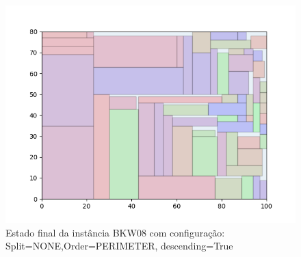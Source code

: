 \begin{figure}[H]
    \centering
    \caption[]{Estado final da instância BKW08 com configuração: Split=NONE,Order=PERIMETER, descending=True}
    \label{fig:bkw08-none-perimeter-true}
    \includegraphics[scale=0.5]{output/figures/bkw/bkw08/none/perimeter/true/00}
\end{figure}